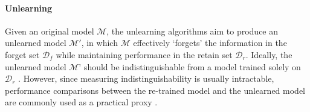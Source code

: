 \paragraph{Unlearning} 
Given an original model $\mathcal{M}$, the unlearning algorithms aim to produce an unlearned model $\mathcal{M}'$, in which $\mathcal{M}$ effectively `forgets' the information in the forget set $\mathcal{D}_f$ while maintaining performance in the retain set $\mathcal{D}_r$. Ideally, the unlearned model $\mathcal{M}’$ should be indistinguishable from a model trained solely on $\mathcal{D}_r$ \citep{sekhari2021remember}. However, since measuring indistinguishability is usually intractable, performance comparisons between the re-trained model and the unlearned model are commonly used as a practical proxy \citep{kurmanji2024towards}.




